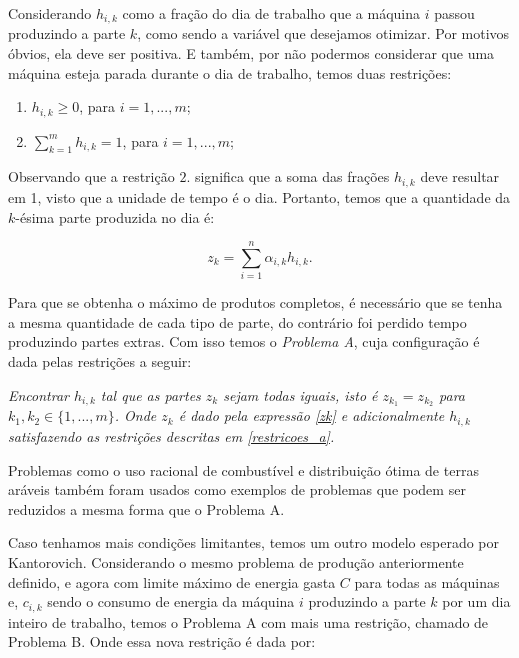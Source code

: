 Considerando \(h_{i, k}\) como a fração do dia de trabalho que a máquina \(i\) passou produzindo
a parte \(k\), como sendo a variável que desejamos otimizar. Por motivos óbvios, ela deve ser positiva.
E também, por não podermos considerar que uma máquina esteja parada durante o dia de trabalho, temos
duas restrições:

\vspace{5pt}

\begin{enumerate}[leftmargin=5em]%
  \item \(h_{i, k} \geq 0\), para \(i =1, ..., m \);
  \item \(\sum_{k=1}^m h_{i, k} = 1\), para \(i =1, ..., m \);
  \label{restricoes_a}
\end{enumerate}

\vspace{5pt}

Observando que a restrição \(2.\) significa que a soma das frações \(h_{i, k}\) deve resultar
em 1, visto que a unidade de tempo é o dia. Portanto, temos que a quantidade da \(k\)-ésima parte
produzida no dia é:

\vspace{-15pt}

\begin{equation}
  z_k = \sum_{i=1}^n \alpha_{i, k} h_{i, k}.
  \label{zk}
\end{equation}


\par Para que se obtenha o máximo de produtos completos, é necessário que se tenha a mesma quantidade de
cada tipo de parte, do contrário foi perdido tempo produzindo partes extras. Com isso temos o
\textit{Problema A}, cuja configuração é dada pelas restrições a seguir:

\textit{
  Encontrar \(h_{i, k}\) tal que as partes \(z_k\) sejam todas iguais, isto é \(z_{k_1} = z_{k_2} \)
  para \(k_1, k_2 \in \{1, ..., m\}\). Onde \(z_k\) é dado pela expressão \ref{zk} e adicionalmente
  \(h_{i, k}\) satisfazendo as restrições descritas em \ref{restricoes_a}.
}

Problemas como o uso racional de combustível e distribuição ótima de terras aráveis
também foram usados como exemplos de problemas que podem ser reduzidos a mesma forma
que o Problema A.

Caso tenhamos mais condições limitantes, temos um outro modelo esperado por Kantorovich.
Considerando o mesmo problema de produção anteriormente definido, e agora com limite
máximo de energia gasta \(C\) para todas as máquinas e, \(c_{i, k}\) sendo o consumo de energia
da máquina \(i\) produzindo a parte \(k\) por um dia inteiro de trabalho, temos o Problema A com
mais uma restrição, chamado de Problema B. Onde essa nova restrição é dada por:

